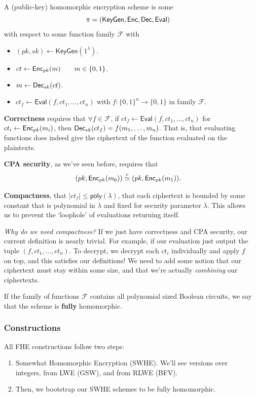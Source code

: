 \begin{definition}\label{def:fhe}
    A (public-key) homomorphic encryption scheme is some
    \[\pi = (\mathsf{KeyGen}, \operatorname{\mathsf{Enc}}, \operatorname{\mathsf{Dec}}, \mathsf{Eval})\]
    with respect to some function family $\mathcal{F}$ with
    \begin{itemize}
        \item $(pk, sk)\leftarrow \mathsf{KeyGen}(1^\lambda)$.
        \item $ct\leftarrow \operatorname{\mathsf{Enc}}_{pk}(m)\qquad m\in \{0, 1\}$.
        \item $m\leftarrow \operatorname{\mathsf{Dec}}_{sk}(ct)$.
        \item $ct_f\leftarrow \mathsf{Eval}(f, ct_1, \dots, ct_n)$ with $f : \{0, 1\}^n\to \{0, 1\}$ in family $\mathcal{F}$.
    \end{itemize}

    \textbf{Correctness} requires that $\forall f\in \mathcal{F}$, if $ct_f \leftarrow \mathsf{Eval}(f, ct_1, \dots, ct_n)$ for $ct_i\leftarrow \operatorname{\mathsf{Enc}}_{pk}(m_i)$, then $\operatorname{\mathsf{Dec}}_{sk}(ct_f) = f(m_1, \dots, m_n)$. That is, that evaluating functions does indeed give the ciphertext of the function evaluated on the plaintexts.

    \textbf{CPA security}, as we've seen before, requires that
    \[(pk, \operatorname{\mathsf{Enc}}_{pk}(m_0))\overset{c}{\simeq}(pk, \operatorname{\mathsf{Enc}}_{pk}(m_1)).\]
    
    \textbf{Compactness}, that $|ct_f| \leq \mathsf{poly}(\lambda)$, that each ciphertext is bounded by some constant that is polynomial in $\lambda$ and fixed for security parameter $\lambda$. This allows us to prevent the `loophole' of evaluations returning itself.
\end{definition}

\textit{Why do we need compactness?} If we just have correctness and CPA security, our current definition is nearly trivial. For example, if our evaluation just output the tuple $(f, ct_1, \dots, ct_n)$. To decrypt, we decrypt each $ct_i$ individually and apply $f$ on top, and this satisfies our definitions! We need to add some notion that our ciphertext must stay within some size, and that we're actually \emph{combining} our ciphertexts.

If the family of functions $\mathcal{F}$ contains all polynomial sized Boolean circuits, we say that the scheme is \textbf{fully} homomorphic.

\subsubsection{Constructions}
All FHE constructions follow two steps:
\begin{enumerate}
    \item Somewhat Homomorphic Encryption (SWHE). We'll see versions over integers, from LWE (GSW), and from RLWE (BFV).
    \item Then, we bootstrap our SWHE schemes to be fully homomorphic.
\end{enumerate}

